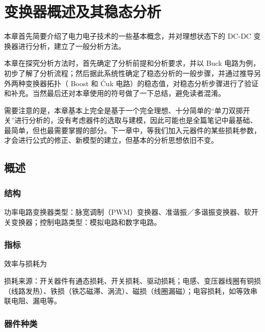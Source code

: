 
\chapter{变换器概述及其稳态分析}

本章首先简要介绍了电力电子技术的一些基本概念，并对理想状态下的 DC-DC 变换器进行分析，建立了一般分析方法。

本章在探究分析方法时，首先确定了分析前提和分析要求，并以 Buck 电路为例，初步了解了分析流程；然后据此系统性确定了稳态分析的一般步骤，并通过推导另外两种变换器拓扑（ Boost 和 \textup{\'{C}uk} 电路）的稳态值，对稳态分析步骤进行了验证和补充。当然最后还对本章使用的符号做了一下总结，避免读者混淆。

需要注意的是，本章基本上完全是基于一个完全理想、十分简单的“单刀双掷开关”进行分析的，没有考虑器件的选取与建模，因此可能也是全篇笔记中最基础、最简单，但也最需要掌握的部分。下一章中，等我们加入元器件的某些损耗参数，才会进行公式的修正、新模型的建立，但基本的分析思想依旧不变。

\section{概述}

\subsection{结构}


功率电路变换器类型：脉宽调制（PWM）变换器、准谐振／多谐振变换器、软开关变换器；控制电路类型：模拟电路和数字电路。

\subsection{指标}

效率与损耗为

损耗来源：开关器件有通态损耗、开关损耗、驱动损耗；电感、变压器线圈有铜损（线路发热）、铁损（铁芯磁滞、涡流）、磁损（线圈漏磁）；电容损耗，如等效串联电阻、漏电等。

\subsection{器件种类}

